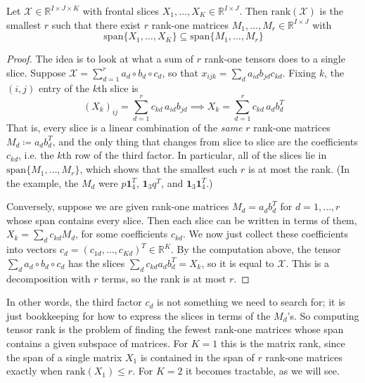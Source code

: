   \begin{lemma}
    \label{lem:slice-span}
    Let $\mathcal{X} \in \mathbb{R}^{I \times J \times K}$ with frontal slices $X_1, \ldots, X_K \in \mathbb{R}^{I \times J}$. Then $\mathrm{rank}(\mathcal{X})$ is the smallest $r$ such that there exist $r$ rank-one matrices $M_1, \ldots, M_r \in \mathbb{R}^{I \times J}$ with
    \begin{equation}
      \mathrm{span}\{X_1, \ldots, X_K\} \subseteq \mathrm{span}\{M_1, \ldots, M_r\}
    \end{equation}
  \end{lemma}
  \begin{proof}
    The idea is to look at what a sum of $r$ rank-one tensors does to a single slice. Suppose $\mathcal{X} = \sum_{d=1}^r a_d \circ b_d \circ c_d$, so that $x_{ijk} = \sum_d a_{id} b_{jd} c_{kd}$. Fixing $k$, the $(i,j)$ entry of the $k$th slice is
    \begin{equation}
      (X_k)_{ij} = \sum_{d=1}^r c_{kd} \, a_{id} b_{jd} \implies X_k = \sum_{d=1}^r c_{kd} \, a_d b_d^T
    \end{equation}
    That is, every slice is a linear combination of the \textit{same} $r$ rank-one matrices $M_d \coloneqq a_d b_d^T$, and the only thing that changes from slice to slice are the coefficients $c_{kd}$, i.e. the $k$th row of the third factor. In particular, all of the slices lie in $\mathrm{span}\{M_1, \ldots, M_r\}$, which shows that the smallest such $r$ is at most the rank. (In the example, the $M_d$ were $p \mathbf{1}_4^T$, $\mathbf{1}_3 q^T$, and $\mathbf{1}_3 \mathbf{1}_4^T$.)

    Conversely, suppose we are given rank-one matrices $M_d = a_d b_d^T$ for $d = 1, \ldots, r$ whose span contains every slice. Then each slice can be written in terms of them, $X_k = \sum_d c_{kd} M_d$, for some coefficients $c_{kd}$. We now just collect these coefficients into vectors $c_d = (c_{1d}, \ldots, c_{Kd})^T \in \mathbb{R}^K$. By the computation above, the tensor $\sum_d a_d \circ b_d \circ c_d$ has the slices $\sum_d c_{kd} a_d b_d^T = X_k$, so it is equal to $\mathcal{X}$. This is a decomposition with $r$ terms, so the rank is at most $r$.
  \end{proof}

  In other words, the third factor $c_d$ is not something we need to search for; it is just bookkeeping for how to express the slices in terms of the $M_d$'s. So computing tensor rank is the problem of finding the fewest rank-one matrices whose span contains a given subspace of matrices. For $K = 1$ this is the matrix rank, since the span of a single matrix $X_1$ is contained in the span of $r$ rank-one matrices exactly when $\mathrm{rank}(X_1) \leq r$. For $K = 2$ it becomes tractable, as we will see.

